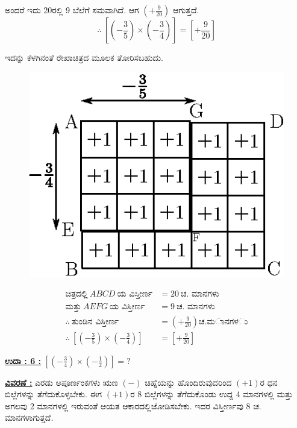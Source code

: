 ಅಂದರೆ ಇದು 20ರಲ್ಲಿ 9 ಬೆಲೆಗೆ ಸಮವಾಗಿದೆ. ಆಗ $\left(+\frac{9}{20} \right)$ ಆಗುತ್ತದೆ. 
$$
\therefore~ \left[\left(-\frac{3}{5}\right) \times \left(-\frac{3}{4}\right) \right] = \left[+\frac{9}{20} \right]
$$

ಇದನ್ನು ಕೆಳಗಿನಂತೆ ರೇಖಾಚಿತ್ರದ ಮೂಲಕ ತೋರಿಸಬಹುದು. 
\begin{figure}[H]
\centering
\includegraphics[scale=0.7]{src/figure/chap3/fig3-27b.eps}
\end{figure}
\vskip -1.2cm
\begin{align*}
\text{ಚಿತ್ರದಲ್ಲಿ}~ ABCD ~\text{ಯ ವಿಸ್ತೀರ್ಣ} & = 20~ \text{ಚ. ಮಾನಗಳು}\\
\text{ಮತ್ತು}~ AEFG ~\text{ಯ ವಿಸ್ತೀರ್ಣ} & = 9~ \text{ಚ. ಮಾನಗಳು}\\
\therefore~ \text{ತುಂಡಿನ ವಿಸ್ತೀರ್ಣ} & = \left(+\frac{9}{20} \right) ಚ. ಮಾನಗಳು\\
\therefore~ \left[\left(-\frac{3}{5}\right) \times \left(-\frac{3}{4}\right) \right] & = \left[+ \frac{9}{20} \right]
\end{align*}

\noindent
{\textbf{\underline{ಉದಾ : 6 :}}} $\left[\left(-\frac{3}{4}\right) \times \left(-\frac{1}{2}\right) \right] = ?$

\noindent
{\textbf{\underline{ವಿವರಣೆ :}}} ಎರಡು ಅಪೂರ್ಣಂಕಗಳು ಋಣ $(-)$ ಚಿಹ್ನೆಯನ್ನು ಹೊಂದಿರುವುದರಿಂದ $(+1)$ರ ಧನ ಬಿಲ್ಲೆಗಳನ್ನು ತೆಗೆದುಕೊಳ್ಳಬೇಕು. ಈಗ $(+1)$ರ 8 ಬಿಲ್ಲೆಗಳನ್ನು ತೆಗೆದು\-ಕೊಂಡು ಉದ್ದ 4 ಮಾನಗಳಲ್ಲಿ ಮತ್ತು ಅಗಲವು 2 ಮಾನಗಳಲ್ಲಿ ಇರುವಂತೆ ಆಯತ ಆಕಾರದಲ್ಲಿ\break  ಜೋಡಿಸಬೇಕು. ಇದರ ವಿಸ್ತೀರ್ಣವು 8 ಚ. ಮಾನಗಳಾಗುತ್ತದೆ. 

